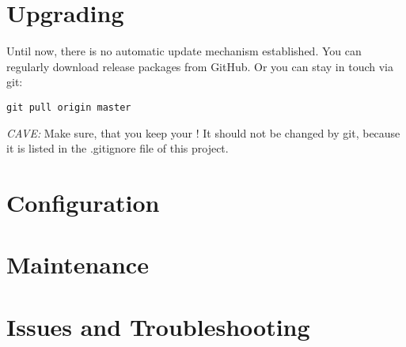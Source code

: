 \section{Upgrading}
Until now, there is no automatic update mechanism established.
You can regularly download release packages from GitHub. Or you can stay in touch via git:
\begin{lstlisting}
git pull origin master
\end{lstlisting}
\emph{CAVE:} Make sure, that you keep your ! It should not be changed by git, because it is listed in the .gitignore file of this project.
\section{Configuration}
\section{Maintenance}
\section{Issues and Troubleshooting}


